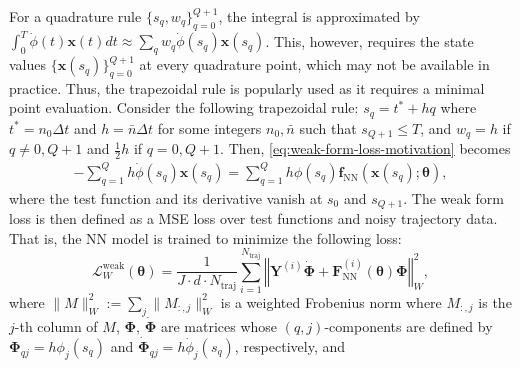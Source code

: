 \documentclass[final]{siamltex}
\newcommand{\bfa}[1]{\boldsymbol{#1}}
\begin{document}
For a quadrature rule $\{s_q, w_q\}_{q=0}^{Q+1}$, the integral is approximated by
$\int_0^T \dot{\phi}(t)\bfa{x}(t)dt \approx \sum_{q} w_q \dot{\phi}(s_q)\bfa{x}(s_q)$.
This, however, requires the state values $\{\bfa{x}(s_q)\}_{q=0}^{Q+1}$ at every quadrature point, which may not be available in practice. 
Thus, the trapezoidal rule is popularly used as it requires a minimal point evaluation. 
Consider the following trapezoidal rule: $s_q = t^* + hq$ where $t^*=n_0\Delta t$ and $h=\bar{n}\Delta t$ for some integers $n_0, \bar{n}$ such that $s_{Q+1} \le T$,
and $w_q = h$ if $q \ne 0, Q+1$ and $\frac{1}{2}h$ if $q = 0, Q+1$.
Then, \eqref{eq:weak-form-loss-motivation} becomes 
\begin{align*}
    -\sum_{q=1}^Q h \dot{\phi}(s_q)\bfa{x}(s_q) = \sum_{q=1}^Q h\phi(s_q)\bfa{f}_{\text{NN}}(\bfa{x}(s_q);\bfa{\theta}),
\end{align*}
where the test function and its derivative vanish at $s_0$ and $s_{Q+1}$.
The weak form loss is then defined as a MSE loss over test functions and noisy trajectory data. That is, the NN model is trained to minimize the following loss:
\begin{equation}  \label{def:weak-form-loss}
\mathcal{L}_W^\text{weak}(\bfa{\theta}) = \frac{1}{J\cdot d\cdot N_{\text{traj}}} \sum\limits_{i=1}^{N_\text{traj}} \left\Vert \bfa{Y}^{(i)}\dot{\bfa{\Phi}} + \bfa{F}_{\text{NN}}^{(i)}(\bfa{\theta}) \bfa{\Phi} \right\Vert_{W}^2,
\end{equation}
where $\|M\|_{W}^2 := \sum_{j} \|M_{:,j}\|_W^2$ is a weighted Frobenius norm where $M_{:,j}$ is the $j$-th column of $M$, 
$\bfa{\Phi}, \, \dot{\bfa{\Phi}}$ are matrices whose $(q,j)$-components are defined by $\bfa{\Phi}_{q j} = h\phi_j(s_q)$ 
and $\dot{\bfa{\Phi}}_{q j} = h\dot{\phi}_j(s_q)$, respectively, and 
\end{document}
